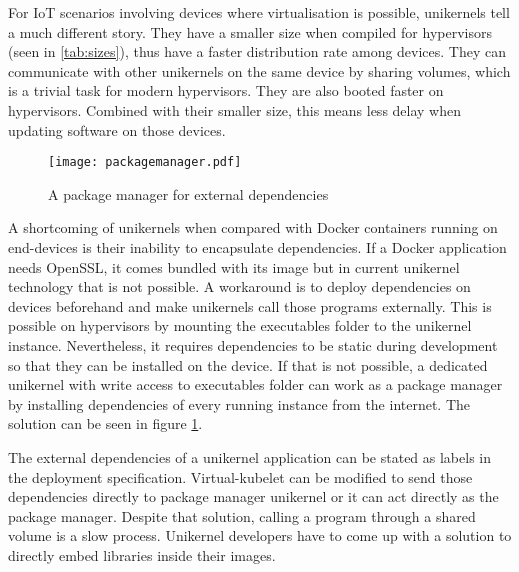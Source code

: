 For IoT scenarios involving devices where virtualisation is possible, unikernels tell a much different story. They have a smaller size when compiled for hypervisors (seen in \ref{tab:sizes}), thus have a faster distribution rate among devices. They can communicate with other unikernels on the same device by sharing volumes, which is a trivial task for modern hypervisors. They are also booted faster on hypervisors. Combined with their smaller size, this means less delay when updating software on those devices. 

\begin{figure}[htpb]
    \centering
    \texttt{[image: packagemanager.pdf]}
\caption{A package manager for external dependencies}\label{fig:package}
\end{figure}


A shortcoming of unikernels when compared with Docker containers running on end-devices is their inability to encapsulate dependencies. If a Docker application needs OpenSSL, it comes bundled with its image but in current unikernel technology that is not possible. A workaround is to deploy dependencies on devices beforehand and make unikernels call those programs externally. This is possible on hypervisors by mounting the executables folder to the unikernel instance. Nevertheless, it requires dependencies to be static during development so that they can be installed on the device. If that is not possible, a dedicated unikernel with write access to executables folder can work as a package manager by installing dependencies of every running instance from the internet. The solution can be seen in figure \ref{fig:package}.

The external dependencies of a unikernel application can be stated as labels in the deployment specification. Virtual-kubelet can be modified to send those dependencies directly to package manager unikernel or it can act directly as the package manager. Despite that solution, calling a program through a shared volume is a slow process. Unikernel developers have to come up with a solution to directly embed libraries inside their images.
